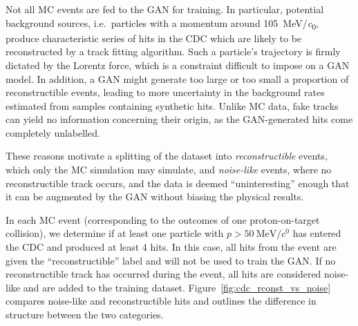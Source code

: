 Not all MC events are fed to the GAN for training. In particular, potential
background sources, i.e.\ particles with a momentum around
\SI{105}{MeV/\clight}, produce characteristic series of hits in the CDC which
are likely to be reconstructed by a track fitting algorithm. Such a particle's
trajectory is firmly dictated by the Lorentz force, which is a constraint
difficult to impose on a GAN model. In addition, a GAN might generate too large
or too small a proportion of reconstructible events, leading to more uncertainty
in the background rates estimated from samples containing synthetic hits. Unlike
MC data, fake tracks can yield no information concerning their origin, as the
GAN-generated hits come completely unlabelled.

These reasons motivate a splitting of the dataset into \emph{reconstructible}
events, which only the MC simulation may simulate, and \emph{noise-like} events,
where no reconstructible track occurs, and the data is deemed ``uninteresting''
enough that it can be augmented by the GAN without biasing the physical results.


In each MC event (corresponding to the outcomes of one proton-on-target
collision), we determine if at least one particle with $p >
\SI{50}{\MeV/\clight}$ has entered the CDC and produced at least 4 hits. In this
case, all hits from the event are given the ``reconstructible'' label and will
not be used to train the GAN. If no reconstructible track has occurred during
the event, all hits are considered noise-like and are added to the training
dataset. Figure~\ref{fig:cdc_rconst_vs_noise} compares noise-like and
reconstructible hits and outlines the difference in structure between the two
categories.

